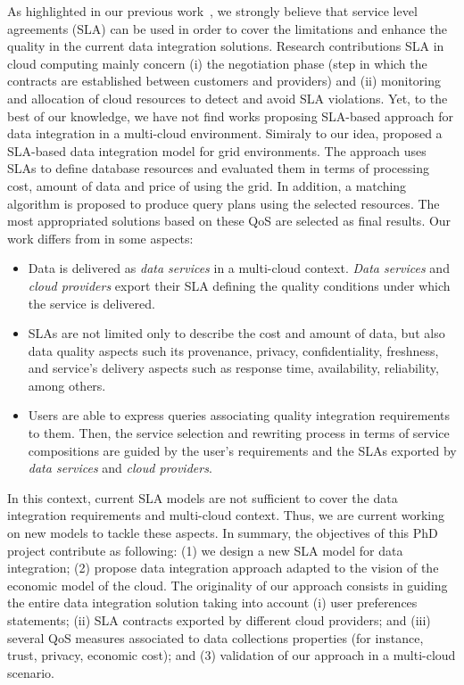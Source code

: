 As highlighted in our previous work~\cite{Carvalho2015}, we strongly believe that service level agreements (SLA) can be used in order to cover the limitations and enhance the quality in the current data integration solutions. Research contributions SLA in cloud computing mainly concern (i) the negotiation phase (step in which the contracts are established between customers and providers) and (ii) monitoring and allocation of cloud resources to detect and avoid SLA violations. Yet, to the best of our knowledge, we have not find works proposing SLA-based approach for data integration in a multi-cloud environment. Simiraly to our idea, \cite{Nie07} proposed a SLA-based data integration model for grid environments. The approach uses SLAs to define database resources and evaluated them in terms of processing cost, amount of data and price of using the grid. In addition, a matching algorithm is proposed to produce query plans using the selected resources. The most appropriated solutions based on these QoS are selected as final results. Our work differs from \cite{Nie07} in some aspects: 
\begin{itemize}
\item Data is delivered as \textit{data services} in a multi-cloud context. \textit{Data services} and \textit{cloud providers} export their SLA defining the quality conditions under which the service is delivered.
\item SLAs are not limited only to describe the cost and amount of data, but also data quality aspects such its provenance, privacy, confidentiality, freshness, and service's delivery aspects such as response time, availability, reliability, among others.
\item Users are able to express queries associating quality integration requirements to them. Then, the service selection and rewriting process in terms of service compositions are guided by the user's requirements and the SLAs exported by \textit{data services} and \textit{cloud providers}.
\end{itemize}

In this context, current SLA models are not sufficient to cover the data integration requirements and multi-cloud context. Thus, we are current working on new models to tackle these aspects. In summary, the objectives of this PhD project contribute as following: (1) we design a new SLA model for data integration; (2) propose data integration approach adapted to the vision of the economic model of the cloud. The originality of our approach consists in guiding the entire data integration solution taking into account (i) user preferences statements; (ii) SLA contracts exported by different cloud providers; and (iii) several QoS measures associated to data collections properties (for instance, trust, privacy, economic cost); and (3) validation of our approach in a multi-cloud scenario.
